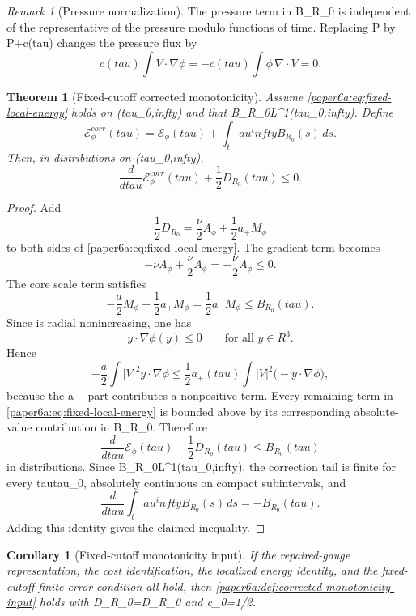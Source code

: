 \documentclass[11pt]{amsart}
\def\({}%
\def\){}%
\def\tilde#1{#1}%
\def\mathfrak#1{#1}%
\def\mathrm#1{#1}%
\def\mathbb#1{#1}%
\def\tau{tau}%
\def\infty{infty}%
\theoremstyle{plain}
\newtheorem{theorem}{Theorem}[section]
\newtheorem{corollary}[corollary]{Corollary}
\theoremstyle{definition}
\theoremstyle{remark}
\newtheorem{remark}[remark]{Remark}
\begin{document}
\begin{remark}[Pressure normalization]
The pressure term in \(B_{R_0}\) is independent of the representative of the
pressure modulo functions of time.  Replacing \(P\) by \(P+c(\tau)\) changes
the pressure flux by
\[
  c(\tau)\int V\cdot\nabla\phi
  =
  -c(\tau)\int \phi\,\nabla\cdot V
  =0.
\]
\end{remark}

\begin{theorem}[Fixed-cutoff corrected monotonicity]
\label{paper6a:thm:fixed-corrected-monotonicity}
Assume \eqref{paper6a:eq:fixed-local-energy} holds on
\((\tau_0,\infty)\) and that \(B_{R_0}\in L^1(\tau_0,\infty)\).  Define
\[
  \mathcal E_\phi^{\mathrm{corr}}(\tau)
  =
  \mathcal E_\phi(\tau)+\int_\tau^\infty B_{R_0}(s)\,ds .
\]
Then, in distributions on \((\tau_0,\infty)\),
\[
  \frac{d}{d\tau}\mathcal E_\phi^{\mathrm{corr}}(\tau)
  +\frac12\tilde{\mathfrak D}_{R_0}(\tau)\le0 .
\]
\end{theorem}

\begin{proof}
Add
\[
  \frac12\tilde{\mathfrak D}_{R_0}
  =
  \frac{\nu}{2}A_\phi+\frac12a_+M_\phi
\]
to both sides of \eqref{paper6a:eq:fixed-local-energy}.  The gradient term
becomes
\[
  -\nu A_\phi+\frac{\nu}{2}A_\phi=-\frac{\nu}{2}A_\phi\le0.
\]
The core scale term satisfies
\[
  -\frac{a}{2}M_\phi+\frac12a_+M_\phi
  =
  \frac12a_-M_\phi
  \le B_{R_0}(\tau).
\]
Since \(\phi\) is radial nonincreasing, one has
\[
  y\cdot\nabla\phi(y)\le0
  \qquad\text{for all }y\in\mathbb R^3.
\]
Hence
\[
  -\frac{a}{2}\int |V|^2y\cdot\nabla\phi
  \le
  \frac12a_+(\tau)\int |V|^2\bigl(-y\cdot\nabla\phi\bigr),
  \]
because the \(a_-\)-part contributes a nonpositive term.  Every remaining term
in \eqref{paper6a:eq:fixed-local-energy} is bounded above by its corresponding
absolute-value contribution in \(B_{R_0}\).  Therefore
\[
  \frac{d}{d\tau}\mathcal E_\phi(\tau)
  +\frac12\tilde{\mathfrak D}_{R_0}(\tau)
  \le B_{R_0}(\tau)
\]
in distributions.  Since \(B_{R_0}\in L^1(\tau_0,\infty)\), the correction
tail is finite for every \(\tau\ge\tau_0\), absolutely continuous on compact
subintervals, and
\[
  \frac{d}{d\tau}\int_\tau^\infty B_{R_0}(s)\,ds=-B_{R_0}(\tau).
\]
Adding this identity gives the claimed inequality.
\end{proof}

\begin{corollary}[Fixed-cutoff monotonicity input]\label{paper6a:cor:fixed-input}
If the repaired-gauge representation, the cost identification, the localized
energy identity, and the fixed-cutoff finite-error condition all hold, then
\cref{paper6a:def:corrected-monotonicity-input} holds with
\(\mathcal D_{R_0}=\tilde{\mathfrak D}_{R_0}\) and \(c_0=1/2\).
\end{corollary}
\end{document}
